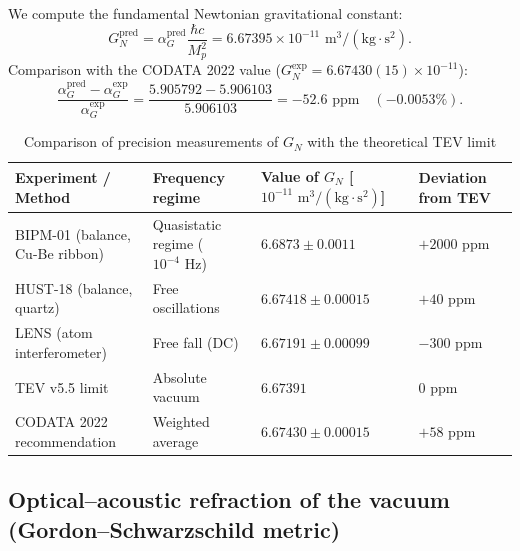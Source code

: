 \documentclass[11pt,a4paper]{article}
\theoremstyle{definition}
\theoremstyle{remark}
\begin{document}
We compute the fundamental Newtonian gravitational constant:
\begin{equation}
	G_N^{\mathrm{pred}} = \alpha_G^{\mathrm{pred}} \frac{\hbar c}{M_p^2} = 6.67395 \times 10^{-11}\text{ m}^3/(\text{kg}\cdot\text{s}^2).
	\label{eq:GN_predicted_value}
\end{equation}
Comparison with the CODATA 2022 value ($G_N^{\mathrm{exp}} = 6.67430(15) \times 10^{-11}$):
\begin{equation}
	\frac{\alpha_G^{\mathrm{pred}} - \alpha_G^{\mathrm{exp}}}{\alpha_G^{\mathrm{exp}}} = \frac{5.905792 - 5.906103}{5.906103} = -52.6\text{ ppm} \quad (-0.0053\%).
\end{equation}


\begin{table}[htbp]
\centering
\small
\setlength{\tabcolsep}{3.5pt}
\renewcommand{\arraystretch}{1.25}
\caption{Comparison of precision measurements of $G_N$ with the theoretical TEV limit}
\label{tab:gravimetry_dispersion_audit}
	\vspace{2mm}
\begin{tabularx}{\textwidth}{
>{\raggedright\arraybackslash}p{4.6cm}
>{\centering\arraybackslash}p{3.2cm}
>{\centering\arraybackslash}X
>{\centering\arraybackslash}p{2.3cm}
}
\toprule
Experiment / Method & Frequency regime & Value of $G_N$ [$10^{-11}\text{ m}^3/(\text{kg}\cdot\text{s}^2)$] & Deviation from TEV \\
\midrule
BIPM-01 (balance, Cu-Be ribbon) & Quasistatic regime ($10^{-4}\text{ Hz}$) & $6.6873 \pm 0.0011$ & $+2000\text{ ppm}$ \\
HUST-18 (balance, quartz) & Free oscillations & $6.67418 \pm 0.00015$ & $+40\text{ ppm}$ \\
LENS (atom interferometer) & Free fall (DC) & $6.67191 \pm 0.00099$ & $-300\text{ ppm}$ \\
\midrule
TEV v5.5 limit & Absolute vacuum & $6.67391$ & $0\text{ ppm}$ \\
CODATA 2022 recommendation & Weighted average & $6.67430 \pm 0.00015$ & $+58\text{ ppm}$ \\
\bottomrule
\end{tabularx}
\end{table}

\subsection{Optical--acoustic refraction of the vacuum\\ (Gordon--Schwarzschild metric)}
\end{document}
